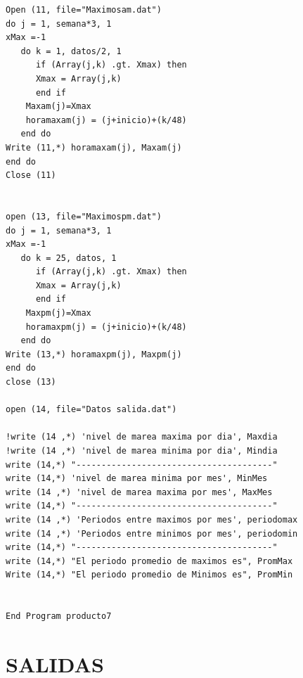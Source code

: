 \documentclass[letterpaper,10pt,twoside,onecolumn]{article}
\begin{document}
\begin{verbatim}
Open (11, file="Maximosam.dat")
do j = 1, semana*3, 1
xMax =-1
   do k = 1, datos/2, 1
      if (Array(j,k) .gt. Xmax) then
      Xmax = Array(j,k)
      end if
    Maxam(j)=Xmax
    horamaxam(j) = (j+inicio)+(k/48)
   end do
Write (11,*) horamaxam(j), Maxam(j)
end do
Close (11)


open (13, file="Maximospm.dat")
do j = 1, semana*3, 1
xMax =-1
   do k = 25, datos, 1
      if (Array(j,k) .gt. Xmax) then
      Xmax = Array(j,k)
      end if
    Maxpm(j)=Xmax
    horamaxpm(j) = (j+inicio)+(k/48)
   end do
Write (13,*) horamaxpm(j), Maxpm(j)
end do
close (13)

open (14, file="Datos salida.dat")

!write (14 ,*) 'nivel de marea maxima por dia', Maxdia
!write (14 ,*) 'nivel de marea minima por dia', Mindia
write (14,*) "---------------------------------------"
write (14,*) 'nivel de marea minima por mes', MinMes
write (14 ,*) 'nivel de marea maxima por mes', MaxMes
write (14,*) "---------------------------------------"
write (14 ,*) 'Periodos entre maximos por mes', periodomax
write (14 ,*) 'Periodos entre minimos por mes', periodomin
write (14,*) "---------------------------------------"
write (14,*) "El periodo promedio de maximos es", PromMax
Write (14,*) "El periodo promedio de Minimos es", PromMin


End Program producto7

\end{verbatim}
\pagebreak

\section{SALIDAS}
\end{document}
